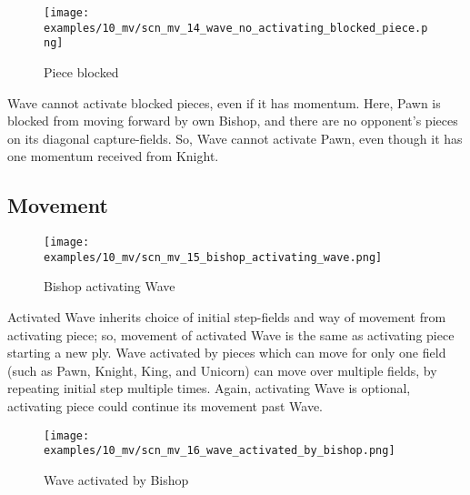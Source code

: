 \vspace*{-1.4\baselineskip}
\noindent
\begin{figure}[h]
\texttt{[image: examples/10\_mv/scn\_mv\_14\_wave\_no\_activating\_blocked\_piece.png]}
\caption{Piece blocked}
\label{fig:scn_mv_14_wave_no_activating_blocked_piece}
\end{figure}

Wave cannot activate blocked pieces, even if it has momentum. Here, Pawn is blocked
from moving forward by own Bishop, and there are no opponent's pieces on its
diagonal capture-fields. So, Wave cannot activate Pawn, even though it has one
momentum received from Knight.

\clearpage %

\subsection*{Movement}
\label{sec:Miranda's veil/Wave/Movement}

\vspace*{-1.5\baselineskip}
\noindent
\begin{figure}[h]
\texttt{[image: examples/10\_mv/scn\_mv\_15\_bishop\_activating\_wave.png]}
\vspace*{-1.4\baselineskip}
\caption{Bishop activating Wave}
\label{fig:scn_mv_15_bishop_activating_wave}
\end{figure}

\vspace*{-0.5\baselineskip}
Activated Wave inherits choice of initial step-fields and way of movement from
activating piece; so, movement of activated Wave is the same as activating piece
starting a new ply. Wave activated by pieces which can move for only one field
(such as Pawn, Knight, King, and Unicorn) can move over multiple fields, by
repeating initial step multiple times. Again, activating Wave is optional,
activating piece could continue its movement past Wave.

\clearpage %

\vspace*{-2.1\baselineskip}
\noindent
\begin{figure}[!h]
\texttt{[image: examples/10\_mv/scn\_mv\_16\_wave\_activated\_by\_bishop.png]}
\vspace*{-1.4\baselineskip}
\caption{Wave activated by Bishop}
\label{fig:scn_mv_16_wave_activated_by_bishop}
\end{figure}

